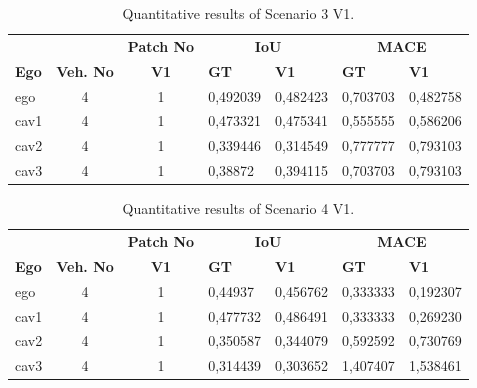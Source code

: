 \begin{table}[H]
    \centering
    \caption{Quantitative results of Scenario 3 V1.}
    \label{tab:scenario3v1_results}
    \begin{tabularx}{\textwidth}{l c c *{4}{X}}
        \toprule
            &             &   \multicolumn{1}{c}{\textbf{Patch No}}  & \multicolumn{2}{c}{\textbf{IoU}} & \multicolumn{2}{c}{\textbf{MACE}}                            \\
        \cmidrule(lr){4-5}\cmidrule(lr){6-7}
        \textbf{Ego}           &
        \textbf{Veh. No}       &
        \textbf{V1}      &
        \textbf{GT}            & \textbf{V1}  &
        \textbf{GT}            & \textbf{V1}  \\
        \midrule
        ego         & 4  & 1 & 0,492039 & 0,482423 & 0,703703 & 0,482758 \\
        cav1        & 4  & 1 & 0,473321 & 0,475341 & 0,555555 & 0,586206 \\
        cav2        & 4  & 1 & 0,339446 & 0,314549 & 0,777777 & 0,793103 \\
        cav3        & 4  & 1 & 0,38872 & 0,394115 & 0,703703 & 0,793103 \\
        \bottomrule
    \end{tabularx}
\end{table}

\begin{table}[H]
    \centering
    \caption{Quantitative results of Scenario 4 V1.}
    \label{tab:scenario4v1_results}
    \begin{tabularx}{\textwidth}{l c c *{4}{X}}
        \toprule
            &             &   \multicolumn{1}{c}{\textbf{Patch No}}  & \multicolumn{2}{c}{\textbf{IoU}} & \multicolumn{2}{c}{\textbf{MACE}}                            \\
        \cmidrule(lr){4-5}\cmidrule(lr){6-7}
        \textbf{Ego}           &
        \textbf{Veh. No}       &
        \textbf{V1}      &
        \textbf{GT}            & \textbf{V1}  &
        \textbf{GT}            & \textbf{V1}  \\
        \midrule
        ego         & 4  & 1 & 0,44937 & 0,456762 & 0,333333 & 0,192307 \\
        cav1        & 4  & 1 & 0,477732 & 0,486491 & 0,333333 & 0,269230 \\
        cav2        & 4  & 1 & 0,350587 & 0,344079 & 0,592592 & 0,730769 \\
        cav3        & 4  & 1 & 0,314439 & 0,303652 & 1,407407 & 1,538461 \\
        \bottomrule
    \end{tabularx}
\end{table}

